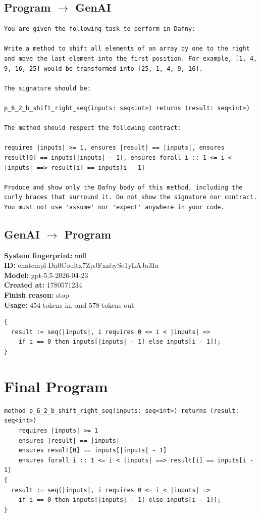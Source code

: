 \documentclass{article}
\begin{document}
\subsection*{Program $\rightarrow$ GenAI}
\begin{lstlisting}
You are given the following task to perform in Dafny:

Write a method to shift all elements of an array by one to the right and move the last element into the first position. For example, [1, 4, 9, 16, 25] would be transformed into [25, 1, 4, 9, 16].

The signature should be:

p_6_2_b_shift_right_seq(inputs: seq<int>) returns (result: seq<int>)

The method should respect the following contract:

requires |inputs| >= 1, ensures |result| == |inputs|, ensures result[0] == inputs[|inputs| - 1], ensures forall i :: 1 <= i < |inputs| ==> result[i] == inputs[i - 1]

Produce and show only the Dafny body of this method, including the curly braces that surround it. Do not show the signature nor contract. You must not use 'assume' nor 'expect' anywhere in your code.
\end{lstlisting}
\subsection*{GenAI $\rightarrow$ Program}
\textbf{System fingerprint: }null
\\\textbf{ID: }chatcmpl-Dn0Coultx7ZpJFxnbySe1yLAJa3Iu
\\\textbf{Model: }gpt-5.5-2026-04-23
\\\textbf{Created at: }1780571234
\\\textbf{Finish reason: }stop
\\\textbf{Usage: }454 tokens in, and 578 tokens out
\begin{lstlisting}
{
  result := seq(|inputs|, i requires 0 <= i < |inputs| =>
    if i == 0 then inputs[|inputs| - 1] else inputs[i - 1]);
}
\end{lstlisting}
\section*{Final Program}
\begin{lstlisting}
method p_6_2_b_shift_right_seq(inputs: seq<int>) returns (result: seq<int>)
	requires |inputs| >= 1
	ensures |result| == |inputs|
	ensures result[0] == inputs[|inputs| - 1]
	ensures forall i :: 1 <= i < |inputs| ==> result[i] == inputs[i - 1]
{
  result := seq(|inputs|, i requires 0 <= i < |inputs| =>
    if i == 0 then inputs[|inputs| - 1] else inputs[i - 1]);
}
\end{lstlisting}
\end{document}
